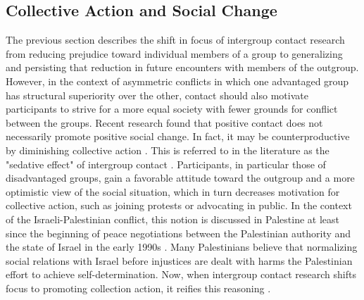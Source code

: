 \documentclass[dissertation,math,vertlayout,pdfa,colorlinks,nologo]{aaltoseries}
\begin{document}
\subsection{Collective Action and Social Change}
The previous section describes the shift in focus of intergroup contact research from reducing prejudice toward individual members of a group to generalizing and persisting that reduction in future encounters with members of the outgroup. However, in the context of asymmetric conflicts in which one advantaged group has structural superiority over the other, contact should also motivate participants to strive for a more equal society with fewer grounds for conflict between the groups. Recent research found that positive contact does not necessarily promote positive social change. In fact, it may be counterproductive by diminishing collective action \cite{saguyIronyHarmonyIntergroup2009,dixonLetThemEat2010,dixonPrejudiceAreNegative2012}. This is referred to in the literature as the "sedative effect" of intergroup contact \cite{cakalInvestigationSocialIdentity2011}. Participants, in particular those of disadvantaged groups, gain a favorable attitude toward the outgroup and a more optimistic view of the social situation, which in turn decreases motivation for collective action, such as joining protests or advocating in public. In the context of the Israeli-Palestinian conflict, this notion is discussed in Palestine at least since the beginning of peace negotiations between the Palestinian authority and the state of Israel in the early 1990s \cite{miariAttitudesPalestiniansNormalization1999}. Many Palestinians believe that normalizing social relations with Israel before injustices are dealt with harms the Palestinian effort to achieve self-determination. Now, when intergroup contact research shifts focus to promoting collection action, it reifies this reasoning \cite{albzourSupportNormalizationRelations2019}.
\end{document}
